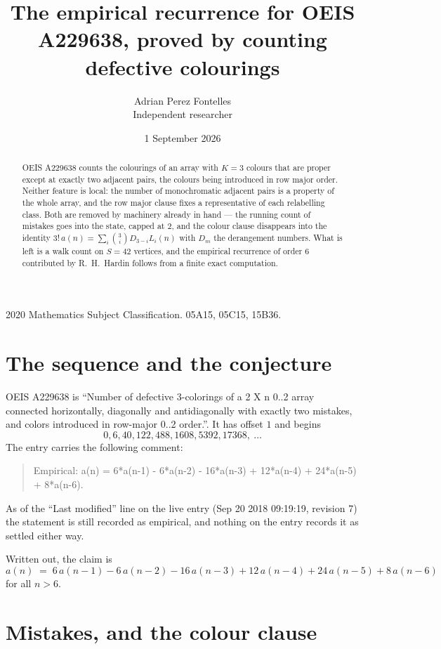 \documentclass[11pt,a4paper]{article}
\title{The empirical recurrence for OEIS A229638, proved by counting defective colourings}
\author{Adrian Perez Fontelles\\ \small Independent researcher}
\date{1 September 2026}
\theoremstyle{plain}
\theoremstyle{definition}
\begin{document}
\maketitle

\begin{abstract}
OEIS A229638 counts the colourings of an array with $K=3$ colours that are proper except at
exactly two adjacent pairs, the colours being introduced in row
major order. Neither feature is local: the number of monochromatic adjacent pairs is a
property of the whole array, and the row major clause fixes a representative of each
relabelling class. Both are removed by machinery already in hand --- the running count of
mistakes goes into the state, capped at $2$, and the colour clause disappears into the
identity $3!\,a(n)=\sum_i\binom{3}{i}D_{3-i}L_i(n)$ with $D_m$ the derangement
numbers. What is left is a walk count on $S=42$ vertices, and the empirical recurrence of
order $6$ contributed by R.~H.~Hardin follows from a finite exact computation.
\end{abstract}

\noindent\small 2020 Mathematics Subject Classification. 05A15, 05C15, 15B36.\normalsize

\section{The sequence and the conjecture}

OEIS A229638 is ``Number of defective 3-colorings of a 2 X n 0..2 array connected horizontally, diagonally and antidiagonally with exactly two mistakes, and colors introduced in row-major 0..2 order.''. It has offset $1$ and begins
\[
0, 6, 40, 122, 488, 1608, 5392, 17368,\ \dots
\]
The entry carries the following comment:
\begin{quote}\small
Empirical: a(n) = 6*a(n-1) - 6*a(n-2) - 16*a(n-3) + 12*a(n-4) + 24*a(n-5) + 8*a(n-6).
\end{quote}
As of the ``Last modified'' line on the live entry (Sep 20 2018 09:19:19, revision 7) the statement is
still recorded as empirical, and nothing on the entry records it as settled either way.

Written out, the claim is
\begin{equation}\label{eq:conj}
a(n)\;=\;6\,a(n-1) - 6\,a(n-2) - 16\,a(n-3) + 12\,a(n-4) + 24\,a(n-5) + 8\,a(n-6)
\end{equation}
for all $n>6$.

\section{Mistakes, and the colour clause}
\end{document}
